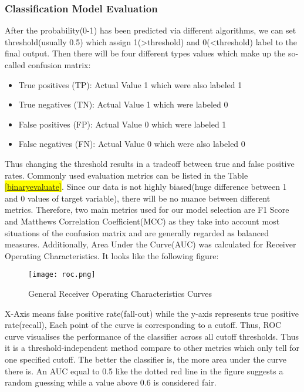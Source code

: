 \subsubsection{Classification Model Evaluation}
After the probability(0-1) has been predicted via different algorithms, we can set threshold(usually 0.5) which assign 1(>threshold) and 0(<threshold) label to the final output. Then there will be four different types values which make up the so-called confusion matrix:
\begin{itemize}
   \item True positives (TP): Actual Value 1 which were also labeled 1
   \item True negatives (TN): Actual Value 1 which were labeled 0
   \item False positives (FP):  Actual Value 0 which were labeled 1
   \item False negatives (FN):  Actual Value 0 which were also labeled 0
\end{itemize}
Thus changing the threshold results in a tradeoff between true and false positive rates. Commonly used evaluation metrics can be listed in the Table \hl{\ref{binaryevaluate}}. Since our data is not highly biased(huge difference between 1 and 0 values of target variable), there will be no nuance between different metrics. Therefore, two main metrics used for our model selection are F1 Score and Matthews Correlation Coefficient(MCC) as they take into account most situations of the confusion matrix and are generally regarded as balanced measures. Additionally,  Area Under the Curve(AUC) was calculated for Receiver Operating Characteristics. It looks like the following figure:
 \begin{figure}[H]
  \centering
  \texttt{[image: roc.png]}
  \caption{General Receiver Operating Characteristics Curves}
\end{figure}
X-Axis means false positive rate(fall-out) while the y-axis represents true positive rate(recall), Each point of the curve is corresponding to a cutoff. Thus, ROC curve visualises the performance of the classifier across all cutoff thresholds. Thus it is a threshold-independent method compare to other metrics which only tell for one specified cutoff. The better the classifier is, the more area under the curve there is. An AUC equal to 0.5 like the dotted red line in the figure suggests a random guessing while a value above 0.6 is considered fair. 

